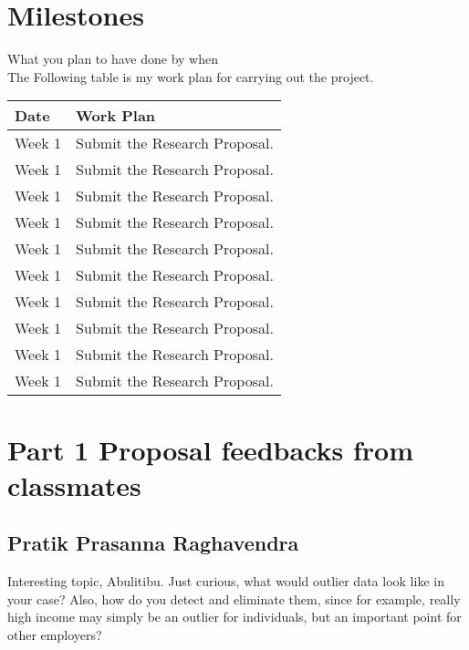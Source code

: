 \section{Milestones}
What you plan to have done by when\\
The Following table is my work plan for carrying out the project.
\begin{center}
	\begin{tabular}{ | l |p{5cm} |}
		\hline
		Date & Work Plan \\ \hline
		Week 1 & Submit the Research Proposal.\\\hline
		Week 1 & Submit the Research Proposal.\\\hline
		Week 1 & Submit the Research Proposal.\\\hline
		Week 1 & Submit the Research Proposal.\\\hline
		Week 1 & Submit the Research Proposal.\\\hline
		Week 1 & Submit the Research Proposal.\\\hline
		Week 1 & Submit the Research Proposal.\\\hline
		Week 1 & Submit the Research Proposal.\\\hline
		Week 1 & Submit the Research Proposal.\\\hline
		Week 1 & Submit the Research Proposal.\\\hline
	\end{tabular}
\end{center}


\section{Part 1 Proposal feedbacks from classmates}
\subsection*{Pratik Prasanna Raghavendra}
Interesting topic, Abulitibu. Just curious, what would outlier data look like in your case? Also, how do you detect and eliminate them, since for example, really high income may simply be an outlier for individuals, but an important point for other employers?\\

